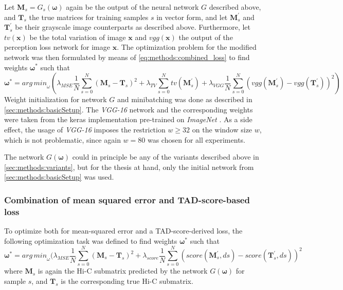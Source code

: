 Let $\mathbf{M}_s=G_s(\bm{\omega})$ again be the output of the neural network $G$ described above, and $\mathbf{T}_s$ the true matrices for training samples $s$ in vector form,
and let $\mathbf{M}^\prime_s$ and $\mathbf{T}^\prime_s$ be their grayscale image counterparts as described above.
Furthermore, let $\mathit{tv}(\mathbf{x})$ be the total variation of image $\mathbf{x}$ and $\mathit{vgg}(\mathbf{x})$ the output of the perception loss network for image $\mathbf{x}$.
The optimization problem for the modified network was then formulated by means of \cref{eq:methods:combined_loss} to find weights $\bm{\omega}^*$ such that
\begin{equation}
 \bm{\omega}^* = \mathit{arg\,min}_\omega (  \lambda_\mathit{MSE} \frac{1}{N} \sum_{s=0}^N (\mathbf{M}_s - \mathbf{T}_s)^2 
                                                     + \lambda_\mathit{TV} \sum_{s=0}^N \mathit{tv}( \mathbf{M}^\prime_s) 
                                                     + \lambda_\mathit{VGG} \frac{1}{N} \sum_{s=0}^N (\mathit{vgg}(\mathbf{M}^\prime_s) - \mathit{vgg}(\mathbf{T}^\prime_s))^2 ) \label{eq:methods:combined_loss}
\end{equation}
Weight initialization for network $G$ and minibatching was done as described in \cref{sec:methods:basicSetup}.
The \emph{VGG-16} network and the corresponding weights were taken from the keras \cite{Chollet2015} implementation pre-trained on \emph{ImageNet} \cite{deng2009}.
As a side effect, the usage of \emph{VGG-16} imposes the restriction $w \geq 32$ on the window size $w$, which is not problematic, since again $w=80$ was chosen for all experiments.

The network $G(\bm{\omega})$ could in principle be any of the variants described above in \cref{sec:methods:variants},
but for the thesis at hand, only the initial network from \cref{sec:methods:basicSetup} was used.

\subsubsection{Combination of mean squared error and TAD-score-based loss} \label{sec:methods:score_loss}
To optimize both for mean-squared error and a TAD-score-derived loss, the following optimization task was defined to find weights $\bm{\omega}^*$ such that
\begin{equation}
 \bm{\omega}^* = \mathit{arg\,min}_\omega (  \lambda_\mathit{MSE} \frac{1}{N} \sum_{s=0}^N (\mathbf{M}_s - \mathbf{T}_s)^2
                                                    + \lambda_\mathit{score} \frac{1}{N} \sum_{s=0}^N (\mathit{score}(\mathbf{M}^\prime_s,ds) - \mathit{score}(\mathbf{T}^\prime_s,ds))^2 \label{eq:methods:score_loss}
\end{equation}
where $\mathbf{M}_s$ is again the Hi-C submatrix predicted by the network $G(\bm{\omega})$ for sample $s$, and $\mathbf{T}_s$ is the corresponding true Hi-C submatrix.

